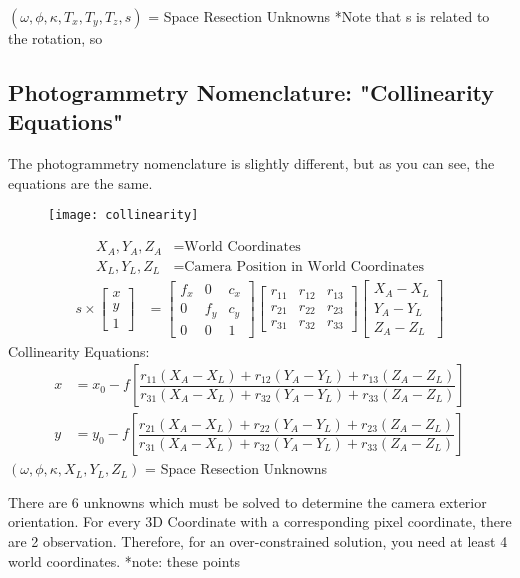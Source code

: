 $(\omega,\phi,\kappa,T_x,T_y,T_z,s)$ = Space Resection Unknowns *Note that s is related to the rotation, so 
\clearpage
\subsection{Photogrammetry Nomenclature: "Collinearity Equations"}
The photogrammetry nomenclature is slightly different, but as you can see, the equations are the same.
\begin{figure}[H]
	\centering
	\texttt{[image: collinearity]}
\end{figure}
\begin{align*}
	X_A,Y_A,Z_A &= \text{World Coordinates} \\
	X_L,Y_L,Z_L &= \text{Camera Position in World Coordinates} 
\end{align*}
\begin{align*}
s\times
\begin{bmatrix}	x \\ y \\ 1 \end{bmatrix} 
&= \begin{bmatrix}
f_x & 0 & c_x \\
0 & f_y & c_y \\
0 & 0 & 1 
\end{bmatrix}
\begin{bmatrix}
r_{11} & r_{12} & r_{13}\\
r_{21} & r_{22} & r_{23}\\
r_{31} & r_{32} & r_{33}
\end{bmatrix}
\begin{bmatrix}	X_A-X_L \\ Y_A-Y_L \\ Z_A-Z_L \end{bmatrix}
\end{align*}
Collinearity Equations: 
\begin{align*}
x &= x_0 - f\left[\dfrac{r_{11}(X_A-X_L) + r_{12}(Y_A-Y_L) + r_{13}(Z_A-Z_L)}{r_{31}(X_A-X_L) + r_{32}(Y_A-Y_L) + r_{33}(Z_A-Z_L)}\right] \\
y &= y_0 - f\left[\dfrac{r_{21}(X_A-X_L) + r_{22}(Y_A-Y_L) + r_{23}(Z_A-Z_L)}{r_{31}(X_A-X_L) + r_{32}(Y_A-Y_L) + r_{33}(Z_A-Z_L)}\right]
\end{align*}
$(\omega,\phi,\kappa,X_L,Y_L,Z_L)$ = Space Resection Unknowns

There are 6 unknowns which must be solved to determine the camera exterior orientation. For every 3D Coordinate with a corresponding pixel coordinate, there are 2 observation.  Therefore, for an over-constrained solution, you need at least 4 world coordinates.  *note: these points 